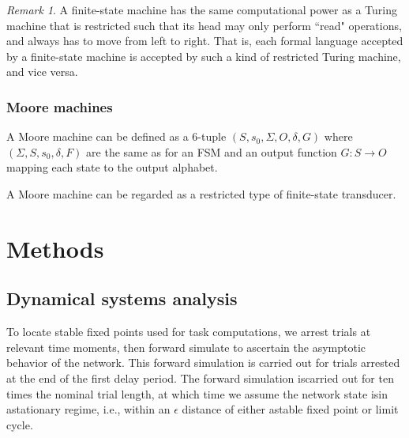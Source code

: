 \documentclass{scrartcl}
\theoremstyle{definition}
\theoremstyle{remark}
\newtheorem{remark}{Remark}
\begin{document}
\begin{remark}
A finite-state machine has the same computational power as a Turing machine that is restricted such that its head may only perform ``read" operations, and always has to move from left to right.
 That is, each formal language accepted by a finite-state machine is accepted by such a kind of restricted Turing machine, and vice versa.
\end{remark}


\subsubsection{Moore machines}%

A Moore machine can be defined as a 6-tuple  $(S,s_{0},\Sigma ,O,\delta ,G)$ where $(\Sigma ,S,s_{0},\delta ,F)$ are the same as for an FSM and 
an output function $G:S\rightarrow O$ mapping each state to the output alphabet.



A Moore machine can be regarded as a restricted type of finite-state transducer.



\section{Methods}

\subsection{Dynamical systems analysis}
To locate stable fixed points used for task computations, we arrest trials at relevant time moments, then forward simulate to ascertain the asymptotic behavior of the network. This forward simulation is carried out for trials arrested at the end of the first delay period. The forward simulation iscarried out for ten times the nominal trial length, at which time we assume the network state isin astationary regime, i.e., within an $\epsilon$ distance of either astable fixed point or limit cycle.


\end{document}

